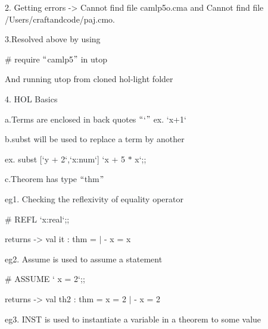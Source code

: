 \documentclass[12pt]{article}
\renewcommand{\_}{\kern-1.5pt\textunderscore\kern-1.5pt}
\begin{document}
2. Getting errors -> Cannot find file camlp5o.cma and Cannot find file /Users/craftandcode/pa\_j.cmo.\par

3.Resolved above by using\par

$\#$ require $``$camlp5$"$  in utop\par

And running utop from cloned hol-light folder\par


\vspace{\baselineskip}
\textcolor[HTML]{1B1F22}{4. HOL Basics}\par


\vspace{\baselineskip}
\textcolor[HTML]{1B1F22}{a.Terms are enclosed in back quotes $``$`$"$  ex. `x+1`}\par

\textcolor[HTML]{1B1F22}{b.subst will be used to replace a term by another}\par

\textcolor[HTML]{1B1F22}{ex. subst [`y + 2`,`x:num`] `x + 5 $\ast$  x`;;}\par


\vspace{\baselineskip}
\textcolor[HTML]{1B1F22}{c.Theorem has type $``$thm$"$ }\par

\textcolor[HTML]{1B1F22}{eg1. Checking the reflexivity of equality operator}\par

\textcolor[HTML]{1B1F22}{$\#$  REFL `x:real`;;}\par

\textcolor[HTML]{1B1F22}{returns -> }val it : thm = $ \vert $ - x = x\par


\vspace{\baselineskip}
eg2. Assume is used to assume a statement\par

$\#$  ASSUME ` x = 2`;;\par

returns -> val th2 : thm = x = 2 $ \vert $ - x = 2\par


\vspace{\baselineskip}
eg3. INST is used to instantiate a variable in a theorem to some value\par
\end{document}
